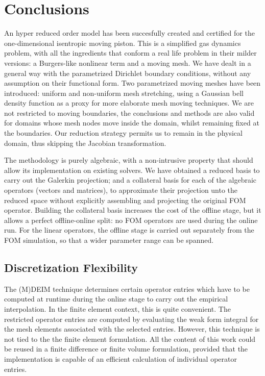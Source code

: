 \documentclass[thesis.tex]{subfiles}
\begin{document}
\section{Conclusions}
An hyper reduced order model has been succesfully created and certified for
the one-dimensional isentropic moving piston.
This is a simplified gas dynamics problem, 
with all the ingredients that conform a real life problem in their milder versions:
a Burgers-like nonlinear term and a moving mesh.
We have dealt in a general way with the parametrized Dirichlet boundary conditions,
without any assumption on their functional form.
Two parametrized moving meshes have been introduced: 
uniform and non-uniform mesh stretching, 
using a Gaussian bell density function as a proxy
for more elaborate mesh moving techniques.
We are not restricted to moving boundaries, 
the conclusions and methods are also valid for domains 
whose mesh nodes move inside the domain, 
whilst remaining fixed at the boundaries.
Our reduction strategy permits us to remain in the physical domain, 
thus skipping the Jacobian transformation.

The methodology is purely algebraic, 
with a non-intrusive property that should allow its implementation on existing solvers.
We have obtained a reduced basis to carry out the Galerkin projection;
and a collateral basis for each of the algebraic operators (vectors and matrices),
to approximate their projection unto the reduced space 
without explicitly assembling and projecting the original FOM operator.
Building the collateral basis increases the cost of the offline stage,
but it allows a perfect offline-online split:
no FOM operators are used during the online run. 
For the linear operators, the offline stage is carried out separately from the FOM simulation,
so that a wider parameter range can be spanned. 

\subsection{Discretization Flexibility}
The (M)DEIM technique determines certain operator entries which 
have to be computed at runtime during the online stage 
to carry out the empirical interpolation.
In the finite element context, this is quite convenient.
The restricted operator entries are computed by evaluating the weak form integral
for the mesh elements associated with the selected entries. 
However, this technique is not tied to the the finite element formulation.
All the content of this work could be reused in a finite difference or finite volume formulation,
provided that the implementation is capable of an efficient calculation of individual operator entries.
\end{document}
